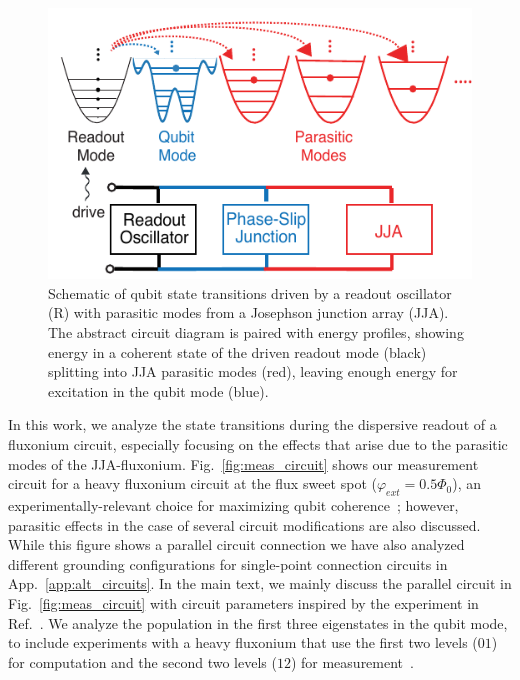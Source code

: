 \documentclass[%
reprint,
superscriptaddress,
 amsmath,amssymb,
 aps,
 prx,
longbibliography,
floatfix,
]{revtex4-2}
\begin{document}
\begin{figure}
    \centering
    \includegraphics[width=\linewidth]{Fluxonium_Readout_manuscript/Figures/Demo_1.pdf}
    \caption{Schematic of qubit state transitions driven by a readout oscillator (R) with parasitic modes from a Josephson junction array (JJA). The abstract circuit diagram is paired with energy profiles, showing energy in a coherent state of the driven readout mode (black) splitting into JJA parasitic modes (red), leaving enough energy for excitation in the qubit mode (blue).
    }
    \label{fig:demo}
\end{figure}
In this work, we analyze the state transitions during the dispersive readout of a fluxonium circuit, especially focusing on the effects that arise due to the parasitic modes of the JJA-fluxonium. Fig.~\ref{fig:meas_circuit} shows our measurement circuit for a heavy fluxonium circuit at the flux sweet spot  ($\varphi_{ext}=0.5\Phi_0$), an experimentally-relevant choice for maximizing qubit coherence~\cite{somoroff_millisecond_2023,nguyen2019high,zhang_universal_2021,manucharyan2009fluxonium}; however, parasitic effects in the case of several circuit modifications are also discussed. While this figure shows a parallel circuit connection we have also analyzed different grounding configurations for single-point connection circuits in App.~\ref{app:alt_circuits}. In the main text, we mainly discuss the parallel circuit in Fig.~\ref{fig:meas_circuit} with circuit parameters inspired by the experiment in Ref.~\cite{zhang_universal_2021}. We analyze the population in the first three eigenstates in the qubit mode, to include experiments with a heavy fluxonium that use the first two levels ($01$) for computation and the second two levels ($12$) for measurement~\cite{zhang_universal_2021}. %
\end{document}
